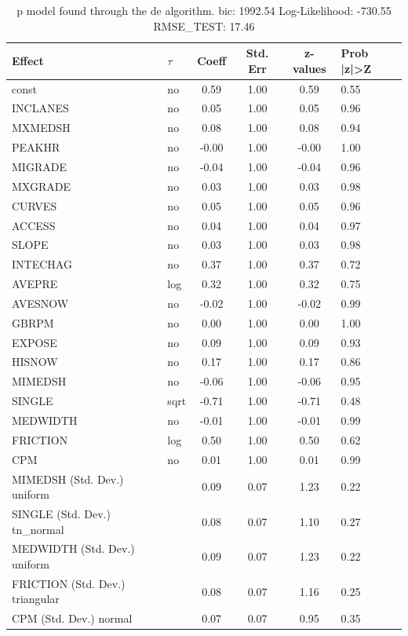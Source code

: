 \begin{table}
	\caption{p model found through the de algorithm. bic: 1992.54 Log-Likelihood: -730.55 RMSE_TEST: 17.46}
	\begin{center}
		\begin{tabular}{|l|l|c|c|c|l|}
			\hline
			Effect & $\tau$ & Coeff & Std. Err & z-values & Prob |z|>Z \\
			\hline
			const & no & 0.59 & 1.00 & 0.59 & 0.55 \\
			\hline
			INCLANES & no & 0.05 & 1.00 & 0.05 & 0.96 \\
			\hline
			MXMEDSH & no & 0.08 & 1.00 & 0.08 & 0.94 \\
			\hline
			PEAKHR & no & -0.00 & 1.00 & -0.00 & 1.00 \\
			\hline
			MIGRADE & no & -0.04 & 1.00 & -0.04 & 0.96 \\
			\hline
			MXGRADE & no & 0.03 & 1.00 & 0.03 & 0.98 \\
			\hline
			CURVES & no & 0.05 & 1.00 & 0.05 & 0.96 \\
			\hline
			ACCESS & no & 0.04 & 1.00 & 0.04 & 0.97 \\
			\hline
			SLOPE & no & 0.03 & 1.00 & 0.03 & 0.98 \\
			\hline
			INTECHAG & no & 0.37 & 1.00 & 0.37 & 0.72 \\
			\hline
			AVEPRE & log & 0.32 & 1.00 & 0.32 & 0.75 \\
			\hline
			AVESNOW & no & -0.02 & 1.00 & -0.02 & 0.99 \\
			\hline
			GBRPM & no & 0.00 & 1.00 & 0.00 & 1.00 \\
			\hline
			EXPOSE & no & 0.09 & 1.00 & 0.09 & 0.93 \\
			\hline
			HISNOW & no & 0.17 & 1.00 & 0.17 & 0.86 \\
			\hline
			MIMEDSH & no & -0.06 & 1.00 & -0.06 & 0.95 \\
			\hline
			SINGLE & sqrt & -0.71 & 1.00 & -0.71 & 0.48 \\
			\hline
			MEDWIDTH & no & -0.01 & 1.00 & -0.01 & 0.99 \\
			\hline
			FRICTION & log & 0.50 & 1.00 & 0.50 & 0.62 \\
			\hline
			CPM & no & 0.01 & 1.00 & 0.01 & 0.99 \\
			\hline
			MIMEDSH (Std. Dev.) uniform &  & 0.09 & 0.07 & 1.23 & 0.22 \\
			\hline
			SINGLE (Std. Dev.) tn_normal &  & 0.08 & 0.07 & 1.10 & 0.27 \\
			\hline
			MEDWIDTH (Std. Dev.) uniform &  & 0.09 & 0.07 & 1.23 & 0.22 \\
			\hline
			FRICTION (Std. Dev.) triangular &  & 0.08 & 0.07 & 1.16 & 0.25 \\
			\hline
			CPM (Std. Dev.) normal &  & 0.07 & 0.07 & 0.95 & 0.35 \\
			\hline
		\end{tabular}
	\end{center}
\end{table}